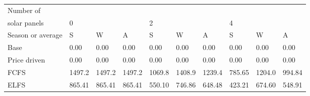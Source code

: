 \begin{table}[h] 
\centering 
\begin{tabular}{l|lll|lll|lll}Number of \\ solar panels&0& & &2& & &4& & \\ \hline 
Season or average & S & W & A & S & W & A & S & W & A \\ \hline 
Base&0.00&0.00&0.00&0.00&0.00&0.00&0.00&0.00&0.00 \\ 
Price driven&0.00&0.00&0.00&0.00&0.00&0.00&0.00&0.00&0.00 \\ 
FCFS&1497.2&1497.2&1497.2&1069.8&1408.9&1239.4&785.65&1204.0&994.84 \\ 
ELFS&865.41&865.41&865.41&550.10&746.86&648.48&423.21&674.60&548.91 \\ 
\end{tabular} 
\end{table}